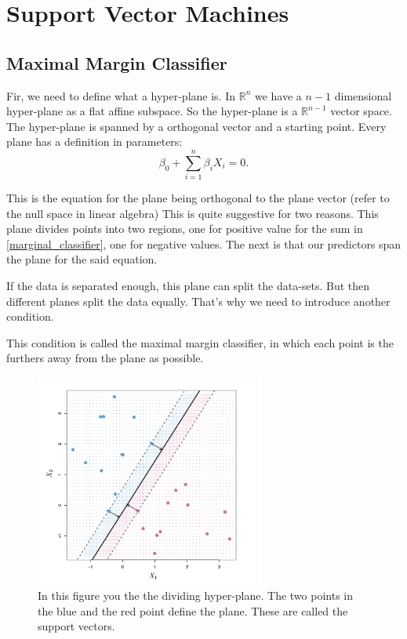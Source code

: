 \documentclass{article}
\begin{document}
\newpage

\section{Support Vector Machines}
\subsection{Maximal Margin Classifier}
Fir, we need to define what a hyper-plane is. In $\mathbb{R}^n$ we have a $n-1$ dimensional hyper-plane as a flat affine subspace. So the hyper-plane is a $\mathbb{R}^{n-1}$ vector space. The hyper-plane is spanned by a orthogonal vector and a starting point. Every plane has a definition in parameters: 
\begin{equation}\label{marginal_classifier}
    \beta_0+\sum_{i=1}^n \beta_i X_i = 0.
\end{equation}
 
This is the equation for the plane being orthogonal to the plane vector (refer to the null space in linear algebra) 
This is quite suggestive for two reasons. This plane divides points into two regions, one for positive value for the sum in  \eqref{marginal_classifier}, one for negative values. The next is that our predictors span the plane for the said equation.

If the data is separated enough, this plane can split the data-sets. But then different planes split the data equally. That's why we need to introduce another condition.

This condition is called the maximal margin classifier, in which each point is the furthers away from the plane as possible.  

\begin{figure}[ht]
    \centering
    \includegraphics[height=70mm]{maximal_margin.png}
    \caption{In this figure you the the dividing hyper-plane. The two points in the blue and the red point define the plane. These are called the support vectors. }
    \label{maximal_margin}
\end{figure}
 
\end{document}
